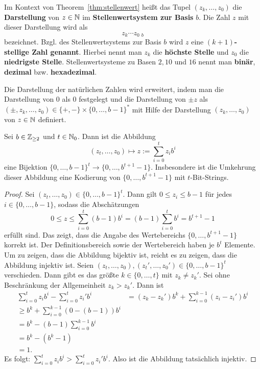 \begin{defn}
	Im Kontext von Theorem~\ref{thm:stellenwert} heißt das Tupel $(z_k,\ldots,z_0)$ die \textbf{Darstellung} von $z \in \mathbb{N}$ im \textbf{Stellenwertsystem zur Basis} $b$. Die Zahl $z$ mit dieser Darstellung wird als 
	\[	
			z_k \cdots z_0 \ {}_{b}
	\]
	bezeichnet. Bzgl. des Stellenwertsystems zur Basis $b$ wird $z$ eine \textbf{$(k+1)$-stellige Zahl genannt}. Hierbei nennt man $z_k$ die \textbf{höchste Stelle} und $z_0$ die \textbf{niedrigste Stelle}.  Stellenwertsysteme zu Basen $2, 10$ und $16$ nennt man \textbf{binär}, \textbf{dezimal} bzw. \textbf{hexadezimal}. 
	
	Die Darstellung der natürlichen Zahlen wird  erweitert, indem man die Darstellung von $0$ als $0$ festgelegt und die Darstellung von $\pm z$ als $(\pm ,z_k,\ldots,z_0) \in \{+,-\} \times \{0,\ldots,b-1\}^\ast$ mit Hilfe der Darstellung $(z_k,\ldots,z_0)$  von $z \in \mathbb{N}$ definiert. 
\end{defn} 

\begin{prop}
	Sei $b \in \mathbb{Z}_{\ge 2}$ und $t \in \mathbb{N}_0$. Dann ist die Abbildung 
	\begin{equation}
	(z_t,\ldots,z_0) \mapsto z:= \sum_{i=0}^t z_i b^i
	\end{equation}
	eine Bijektion $\{0,\ldots,b-1\}^t \to \{0,\ldots,b^{t+1} -1\}$. Insbesondere ist die Umkehrung dieser Abbildung eine Kodierung von $\{0,\ldots,b^{t+1} -1\}$ mit $t$-Bit-Strings. 
\end{prop} 
\begin{proof}
 Sei $(z_t,\ldots,z_0) \in \{0,\ldots,b-1\}^t$. Dann gilt $0 \le z_i  \le b-1$ für jedes $i  \in \{0,\ldots,b-1\}$, sodass die Abschätzungen
 \[
 	0 \le z \le \sum_{i=0}^t (b-1) b^i = (b-1) \sum_{i=0}^t b^i = b^{t+1} -1
 \]
 erfüllt sind. Das zeigt, dass die Angabe des Wertebereichs $\{0,\ldots,b^{t+1} -1\}$ korrekt ist.
 Der Definitionsbereich sowie der Wertebereich haben je $b^t$ Elemente. Um zu zeigen, dass die Abbildung bijektiv ist, reicht es zu zeigen, dass die Abbildung injektiv ist. Seien $(z_t,\ldots,z_0), (z_t',\ldots,z_0') \in \{0,\ldots,b-1\}^t$ verschieden. Dann gibt es das größte $k\in \{0,\ldots,t\}$ mit $z_k \ne z_k'$. Sei ohne Beschränkung der Allgemeinheit $z_k>z_k'$. Dann ist 
 \begin{align*}
 		\sum_{i=0}^t z_i b^i - \sum_{i=0}^t z_i' b^i & = (z_k - z_k')b^k + \sum_{i=0}^{k-1} (z_i -z_i') b^i
 		\\ \ge b^k + \sum_{i=0}^{k-1} (0 - (b-1)) b^i 
 		\\ = b^k - (b-1) \sum_{i=0}^{k-1} b^i
 		\\ = b^k - (b^k - 1) 
 		\\ =1.
 \end{align*}
Es folgt: $\sum_{i=0}^t z_i b^i > \sum_{i=0}^t z_i' b^i $. Also ist die Abbildung tatsächlich injektiv. 
\end{proof} 

